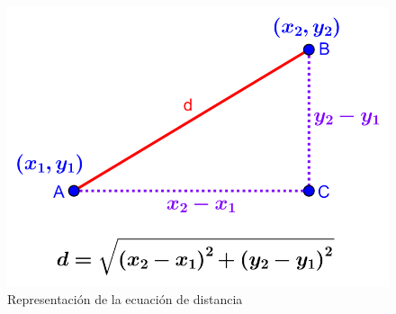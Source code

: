 \documentclass{IEEEcsmag}
\begin{document}
\begin{figure}[h!]
    \centering
    \includegraphics[width=0.6\linewidth]{./latex-imagenes/Ecuacion.png}
    \caption{Representación de la ecuación de distancia}
    \label{fig: Grafica Ecuacion Recta}
\end{figure}
\end{document}
